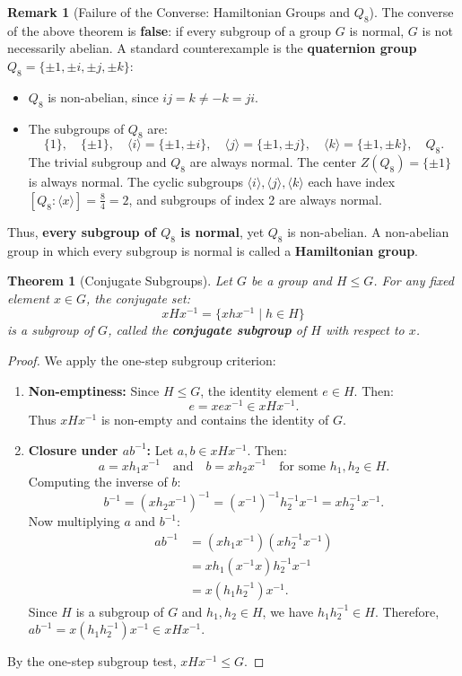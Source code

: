 \documentclass[12pt]{article}
\theoremstyle{definition}
\newtheorem*{remark}{Remark}
\theoremstyle{plain}
\newtheorem{theorem}{Theorem}[section]
\begin{document}
\begin{remark}[Failure of the Converse: Hamiltonian Groups and $Q_8$]
The converse of the above theorem is \textbf{false}: if every subgroup of a group $G$ is normal, $G$ is not necessarily abelian.
A standard counterexample is the \textbf{quaternion group} $Q_8 = \{\pm 1, \pm i, \pm j, \pm k\}$:
\begin{itemize}
    \item $Q_8$ is non-abelian, since $ij = k \neq -k = ji$.
    \item The subgroups of $Q_8$ are:
    \[
    \{1\}, \quad \{\pm 1\}, \quad \langle i \rangle = \{\pm 1, \pm i\}, \quad \langle j \rangle = \{\pm 1, \pm j\}, \quad \langle k \rangle = \{\pm 1, \pm k\}, \quad Q_8.
    \]
    The trivial subgroup and $Q_8$ are always normal. The center $Z(Q_8) = \{\pm 1\}$ is always normal. The cyclic subgroups $\langle i \rangle, \langle j \rangle, \langle k \rangle$ each have index $[Q_8 : \langle x \rangle] = \frac{8}{4} = 2$, and subgroups of index 2 are always normal.
\end{itemize}
Thus, \textbf{every subgroup of $Q_8$ is normal}, yet $Q_8$ is non-abelian. A non-abelian group in which every subgroup is normal is called a \textbf{Hamiltonian group}.
\end{remark}

\begin{theorem}[Conjugate Subgroups]
Let $G$ be a group and $H \le G$. For any fixed element $x \in G$, the conjugate set:
\[
xHx^{-1} = \{xhx^{-1} \mid h \in H\}
\]
is a subgroup of $G$, called the \textbf{conjugate subgroup} of $H$ with respect to $x$.
\end{theorem}
\begin{proof}
We apply the one-step subgroup criterion:
\begin{enumerate}
    \item \textbf{Non-emptiness:} Since $H \le G$, the identity element $e \in H$. Then:
    \[
    e = xex^{-1} \in xHx^{-1}.
    \]
    Thus $xHx^{-1}$ is non-empty and contains the identity of $G$.
    
    \item \textbf{Closure under $ab^{-1}$:} Let $a, b \in xHx^{-1}$. Then:
    \[
    a = xh_1 x^{-1} \quad \text{and} \quad b = xh_2 x^{-1} \quad \text{for some } h_1, h_2 \in H.
    \]
    Computing the inverse of $b$:
    \[
    b^{-1} = (xh_2 x^{-1})^{-1} = (x^{-1})^{-1} h_2^{-1} x^{-1} = x h_2^{-1} x^{-1}.
    \]
    Now multiplying $a$ and $b^{-1}$:
    \begin{align*}
        ab^{-1} &= (xh_1 x^{-1})(x h_2^{-1} x^{-1}) \\
        &= xh_1 (x^{-1}x) h_2^{-1} x^{-1} \\
        &= x(h_1 h_2^{-1})x^{-1}.
    \end{align*}
    Since $H$ is a subgroup of $G$ and $h_1, h_2 \in H$, we have $h_1 h_2^{-1} \in H$.
    Therefore, $ab^{-1} = x(h_1 h_2^{-1})x^{-1} \in xHx^{-1}$.
\end{enumerate}
By the one-step subgroup test, $xHx^{-1} \le G$.
\end{proof}
\end{document}
